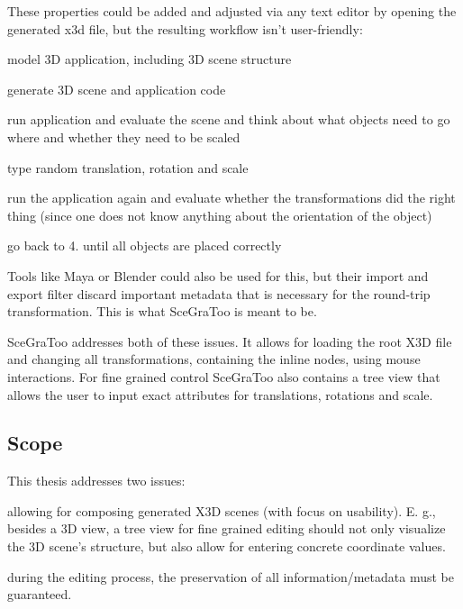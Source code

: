 These properties could be added and adjusted via any text editor by
opening the generated x3d file, but the resulting workflow isn't
user-friendly:

\begin{enumerate*}
\def\labelenumi{\arabic{enumi}.}
\item
  model 3D application, including 3D scene structure
\item
  generate 3D scene and application code
\item
  run application and evaluate the scene and think about what objects
  need to go where and whether they need to be scaled
\item
  type random translation, rotation and scale
\item
  run the application again and evaluate whether the transformations did
  the right thing (since one does not know anything about the
  orientation of the object)
\item
  go back to 4. until all objects are placed correctly
\end{enumerate*}

Tools like Maya or Blender could also be used for this, but their import
and export filter discard important metadata that is necessary for the
round-trip transformation. This is what SceGraToo is meant to be.

SceGraToo addresses both of these issues. It allows for loading the root
X3D file and changing all transformations, containing the inline nodes,
using mouse interactions. For fine grained control SceGraToo also
contains a tree view that allows the user to input exact attributes for
translations, rotations and scale.

\subsection{Scope}\label{scope}

This thesis addresses two issues:

\begin{enumerate*}
\def\labelenumi{\arabic{enumi}.}
\item
  allowing for composing generated X3D scenes (with focus on usability).
  E. g., besides a 3D view, a tree view for fine grained editing should
  not only visualize the 3D scene's structure, but also allow for
  entering concrete coordinate values.
\item
  during the editing process, the preservation of all
  information/metadata must be guaranteed.
\end{enumerate*}
